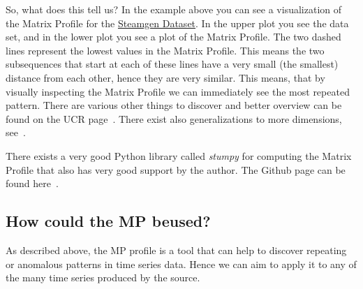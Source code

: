 \documentclass[12pt,a4paper]{article}
\begin{document}
So, what does this tell us? In the example above you can see a
visualization of the Matrix Profile for the
\href{https://www.cs.ucr.edu/~eamonn/iSAX/steamgen.dat}{Steamgen
Dataset}. In the upper plot you see the data set, and in the lower plot
you see a plot of the Matrix Profile. The two dashed lines represent the
lowest values in the Matrix Profile. This means the two subsequences
that start at each of these lines have a very small (the smallest)
distance from each other, hence they are very similar. This means, that
by visually inspecting the Matrix Profile we can immediately see the
most repeated pattern. There are various other things to discover and
better overview can be found on the UCR page~\cite{Keogh:UCRMatrixProfile}. There exist
also generalizations to more dimensions, see~\cite{Yeh:MatrixProfileVI}.

There exists a very good Python library called \emph{stumpy} for
computing the Matrix Profile that also has very good support by the
author. The Github page can be found here~\cite{Law:stumpy}.

\hypertarget{how-could-the-mp-be-used}{%
\subsection{How could the MP beused?}\label{how-could-the-mp-be-used}}

As described above, the MP profile is a tool that can help to discover
repeating or anomalous patterns in time series data. Hence we can aim to
apply it to any of the many time series produced by the source.
\end{document}

